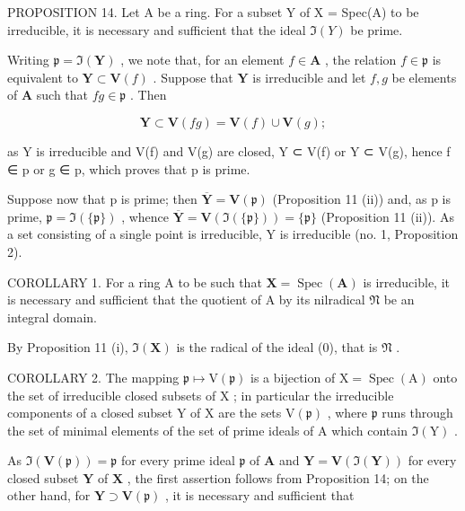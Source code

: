 PROPOSITION 14. Let A be a ring. For a subset Y of X = Spec(A) to be irreducible, it is necessary and sufficient that the ideal \(\Im(Y)\) be prime.

Writing \(\mathfrak{p} = \Im(\mathbf{Y})\) , we note that, for an element \(f \in \mathbf{A}\) , the relation \(f \in \mathfrak{p}\) is equivalent to \(\mathbf{Y} \subset \mathbf{V}(f)\) . Suppose that \(\mathbf{Y}\) is irreducible and let \(f, g\) be elements of \(\mathbf{A}\) such that \(fg \in \mathfrak{p}\) . Then

\[
\mathbf {Y} \subset \mathbf {V} (f g) = \mathbf {V} (f) \cup \mathbf {V} (g);
\]

as Y is irreducible and V(f) and V(g) are closed, Y ⊂ V(f) or Y ⊂ V(g), hence f ∈ p or g ∈ p, which proves that p is prime.

Suppose now that p is prime; then \(\overline{\mathbf{Y}} = \mathbf{V}(\mathfrak{p})\) (Proposition 11 (ii)) and, as p is prime, \(\mathfrak{p} = \Im(\{\mathfrak{p}\})\) , whence \(\overline{\mathbf{Y}} = \mathbf{V}(\Im(\{\mathfrak{p}\})) = \{\mathfrak{p}\}\) (Proposition 11 (ii)). As a set consisting of a single point is irreducible, Y is irreducible (no. 1, Proposition 2).

COROLLARY 1. For a ring A to be such that \(\mathbf{X} = \operatorname{Spec}(\mathbf{A})\) is irreducible, it is necessary and sufficient that the quotient of A by its nilradical \(\mathfrak{N}\) be an integral domain.

By Proposition 11 (i), \(\Im(\mathbf{X})\) is the radical of the ideal (0), that is \(\mathfrak{N}\) .

COROLLARY 2. The mapping \(\mathfrak{p} \mapsto \mathrm{V}(\mathfrak{p})\) is a bijection of \(\mathrm{X} = \operatorname{Spec}(\mathrm{A})\) onto the set of irreducible closed subsets of \(\mathrm{X}\) ; in particular the irreducible components of a closed subset \(\mathrm{Y}\) of \(\mathrm{X}\) are the sets \(\mathrm{V}(\mathfrak{p})\) , where \(\mathfrak{p}\) runs through the set of minimal elements of the set of prime ideals of \(\mathrm{A}\) which contain \(\Im(\mathrm{Y})\) .

As \(\Im (\mathbf{V}(\mathfrak{p})) = \mathfrak{p}\) for every prime ideal \(\mathfrak{p}\) of \(\mathbf{A}\) and \(\mathbf{Y} = \mathbf{V}(\Im (\mathbf{Y}))\) for every closed subset \(\mathbf{Y}\) of \(\mathbf{X}\) , the first assertion follows from Proposition 14; on the other hand, for \(\mathbf{Y} \supset \mathbf{V}(\mathfrak{p})\) , it is necessary and sufficient that

